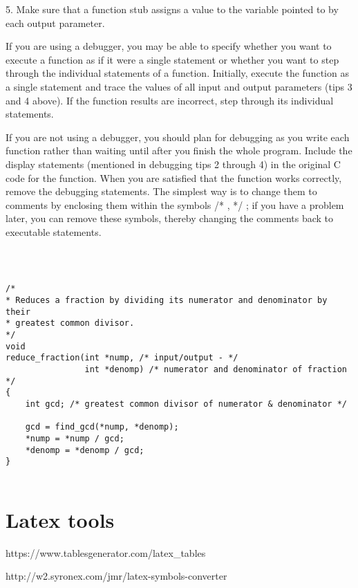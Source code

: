 \documentclass{extarticle}
\begin{document}
\begin{multicols}{2}
5. Make sure that a function stub assigns a value to the variable pointed to by each output parameter.



If you are using a debugger, you may be able to specify whether you want to execute a function as if it were a single statement or whether you want to step through the individual statements of a function. Initially, execute the function as a single statement and trace the values of all input and output parameters (tips 3 and 4 above). If the function results are incorrect, step through its individual statements.

If you are not using a debugger, you should plan for debugging as you write each function rather than waiting until after you finish the whole program. Include the display statements (mentioned in debugging tips 2 through 4) in the original C code for the function. When you are satisfied that the function works correctly, remove the debugging statements. The simplest way is to change them to comments by enclosing them within the symbols /* , */ ; if you have a problem later, you can remove these symbols, thereby changing the comments back to executable statements.








\begin{verbatim}



/*
* Reduces a fraction by dividing its numerator and denominator by their
* greatest common divisor.
*/
void
reduce_fraction(int *nump, /* input/output - */
                int *denomp) /* numerator and denominator of fraction */
{
    int gcd; /* greatest common divisor of numerator & denominator */

    gcd = find_gcd(*nump, *denomp);
    *nump = *nump / gcd;
    *denomp = *denomp / gcd;
}


\end{verbatim}










\section{Latex tools}

https://www.tablesgenerator.com/latex\_tables

http://w2.syronex.com/jmr/latex-symbols-converter


\end{multicols}
\end{document}
